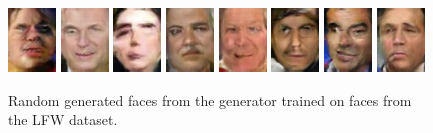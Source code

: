 \begin{figure}[!h]
    \centerline{
        \includegraphics[scale=1]{figures/lfw/appendix3/lfw64x48color_image0008.png}
        \includegraphics[scale=1]{figures/lfw/appendix3/lfw64x48color_image0009.png}
        \includegraphics[scale=1]{figures/lfw/appendix3/lfw64x48color_image0010.png}
        \includegraphics[scale=1]{figures/lfw/appendix3/lfw64x48color_image0011.png}
        \includegraphics[scale=1]{figures/lfw/appendix3/lfw64x48color_image0012.png}
        \includegraphics[scale=1]{figures/lfw/appendix3/lfw64x48color_image0013.png}
        \includegraphics[scale=1]{figures/lfw/appendix3/lfw64x48color_image0014.png}
        \includegraphics[scale=1]{figures/lfw/appendix3/lfw64x48color_image0015.png}
    }
    \caption{\label{fig:lfw-good}Random generated faces from the generator trained on faces from the LFW dataset.}
\end{figure}

